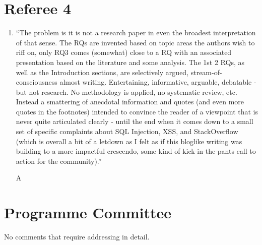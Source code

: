 \documentclass{article}
\begin{document}
\section{Referee 4}
\begin{enumerate}
\item ``The problem is it is not a research paper in even the broadest interpretation of that sense. The RQs are invented based on topic areas the authors wish to riff on, only RQ3 comes (somewhat) close to a RQ with an associated presentation based on the literature and some analysis. The 1st 2 RQs, as well as the Introduction sections, are selectively argued, stream-of-consciousness almost writing. Entertaining, informative, arguable, debatable - but not research. No methodology is applied, no systematic review, etc. Instead a smattering of anecdotal information and quotes (and even more quotes in the footnotes) intended to convince the reader of a viewpoint that is never quite articulated clearly - until the end when it comes down to a small set of specific complaints about SQL Injection, XSS, and StackOverflow (which is overall a bit of a letdown as I felt as if this bloglike writing was building to a more impactful crescendo, some kind of kick-in-the-pants call to action for the community).''
\item[A]
\end{enumerate}
\section{Programme Committee}
No comments that require addressing in detail.
\end{document}
